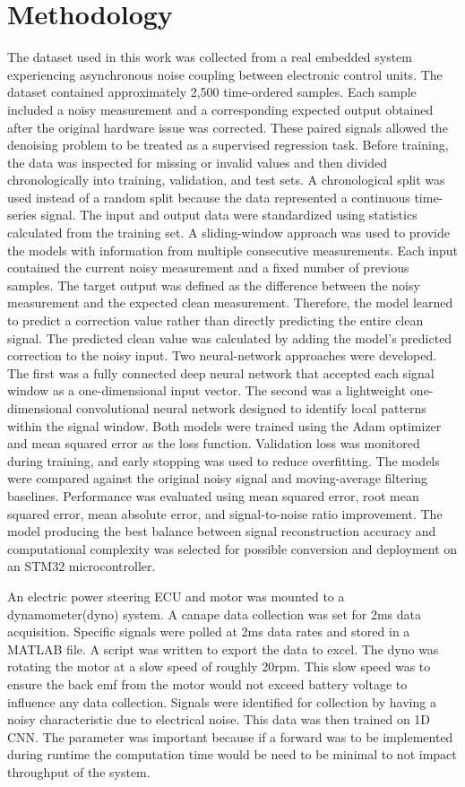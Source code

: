 \documentclass[conference]{IEEEtran}
\begin{document}
\section{Methodology}
The dataset used in this work was collected from a real embedded system experiencing asynchronous noise coupling between electronic control units. The dataset contained approximately 2,500 time-ordered samples. Each sample included a noisy measurement and a corresponding expected output obtained after the original hardware issue was corrected. These paired signals allowed the denoising problem to be treated as a supervised regression task. Before training, the data was inspected for missing or invalid values and then divided chronologically into training, validation, and test sets. A chronological split was used instead of a random split because the data represented a continuous time-series signal. The input and output data were standardized using statistics calculated from the training set. A sliding-window approach was used to provide the models with information from multiple consecutive measurements. Each input contained the current noisy measurement and a fixed number of previous samples. The target output was defined as the difference between the noisy measurement and the expected clean measurement. Therefore, the model learned to predict a correction value rather than directly predicting the entire clean signal. The predicted clean value was calculated by adding the model's predicted correction to the noisy input. Two neural-network approaches were developed. The first was a fully connected deep neural network that accepted each signal window as a one-dimensional input vector. The second was a lightweight one-dimensional convolutional neural network designed to identify local patterns within the signal window. Both models were trained using the Adam optimizer and mean squared error as the loss function. Validation loss was monitored during training, and early stopping was used to reduce overfitting. The models were compared against the original noisy signal and moving-average filtering baselines. Performance was evaluated using mean squared error, root mean squared error, mean absolute error, and signal-to-noise ratio improvement. The model producing the best balance between signal reconstruction accuracy and computational complexity was selected for possible conversion and deployment on an STM32 microcontroller.

An electric power steering ECU and motor was mounted to a dynamometer(dyno) system. A canape data collection was set for 2ms data acquisition. Specific signals were polled at 2ms data rates and stored in a MATLAB file. A script was written to export the data to excel. The dyno was rotating the motor at a slow speed of roughly 20rpm. This slow speed was to ensure the back emf from the motor would not exceed battery voltage to influence any data collection.  Signals were identified for collection by having a noisy characteristic due to electrical noise. This data was then trained on 1D CNN. The parameter was important because if a forward was to be implemented during runtime the computation time would be need to be minimal to not impact throughput of the system.
\end{document}
